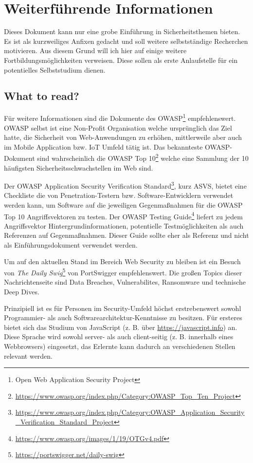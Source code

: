 \section{Weiterführende Informationen}

Dieses Dokument kann nur eine grobe Einführung in Sicherheitsthemen bieten. Es ist als kurzweiliges Anfixen gedacht und soll weitere selbstständige Recherchen motivieren. Aus diesem Grund will ich hier auf einige weitere Fortbildungsmöglichkeiten verweisen. Diese sollen als erste Anlaufstelle für ein potentielles Selbststudium dienen.

\subsection{What to read?}

Für weitere Informationen sind die Dokumente des OWASP\footnote{Open Web Application Security Project} empfehlenswert. OWASP selbst ist eine Non-Profit Organisation welche ursprünglich das Ziel hatte, die Sicherheit von Web-Anwendungen zu erhöhen, mittlerweile aber auch im Mobile Application bzw. IoT Umfeld tätig ist. Das bekannteste OWASP-Dokument sind wahrscheinlich die OWASP Top 10\footnote{\url{https://www.owasp.org/index.php/Category:OWASP_Top_Ten_Project}} welche eine Sammlung der 10 häufigsten Sicherheitsschwachstellen im Web sind.

Der OWASP Application Security Verification Standard\footnote{\url{https://www.owasp.org/index.php/Category:OWASP_Application_Security_Verification_Standard_Project}}, kurz ASVS, bietet eine Checkliste die von Penetration-Testern bzw. Software-Entwicklern verwendet werden kann, um Software auf die jeweiligen Gegenmaßnahmen für die OWASP Top 10 Angriffsvektoren zu testen. Der OWASP Testing Guide\footnote{\url{https://www.owasp.org/images/1/19/OTGv4.pdf}} liefert zu jedem Angriffsvektor Hintergrundinformationen, potentielle Testmöglichkeiten als auch Referenzen auf Gegenmaßnahmen. Dieser Guide sollte eher als Referenz und nicht als Einführungsdokument verwendet werden.

Um auf den aktuellen Stand im Bereich Web Security zu bleiben ist ein Besuch von \textit{The Daily Swig}\footnote{\url{https://portswigger.net/daily-swig}} von PortSwigger empfehlenswert. Die großen Topics dieser Nachrichtenseite sind Data Breaches, Vulnerabilites, Ransomware und technische Deep Dives.

Prinzipiell ist es für Personen im Security-Umfeld höchst erstrebenswert sowohl Programmier- als auch Softwarearchitektur-Kenntnisse zu besitzen. Für ersteres bietet sich das Studium von JavaScript (z. B. über \url{https://javascript.info}) an. Diese Sprache wird sowohl server- als auch client-seitig (z. B. innerhalb eines Webbrowsers) eingesetzt, das Erlernte kann dadurch an verschiedenen Stellen relevant werden.

